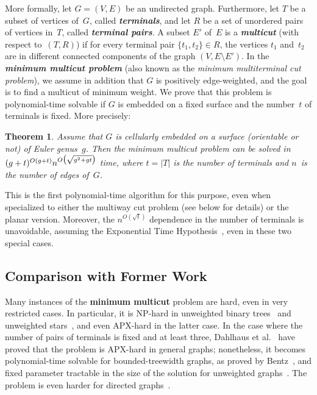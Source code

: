 \documentclass[11pt]{article}
\newcommand{\emphdef}[1]{\textcolor{blueblack}{\textbf{\emph{#1}}}}
\newcommand{\set}[1]{\ensuremath{\{#1\}}}
\theoremstyle{plain}  \newtheorem{theorem}{Theorem}[section]
\theoremstyle{definition}
\begin{document}
More formally, let $G=(V,E)$ be an undirected graph.  Furthermore, let $T$
be a subset of vertices of~$G$, called \emphdef{terminals}, and let $R$ be
a set of unordered pairs of vertices in~$T$, called \emphdef{terminal
  pairs}.  A subset $E'$ of~$E$ is a \emphdef{multicut} (with respect
to~$(T,R)$) if for every terminal pair $\set{t_1,t_2}\in R$, the vertices $t_1$
and~$t_2$ are in different connected components of the graph $(V,E\setminus
E')$.  In the \emphdef{minimum multicut problem} (also known as the
\emph{minimum multiterminal cut problem}), we assume in addition that $G$
is positively edge-weighted, and the goal is to find a multicut of minimum
weight.  We prove that this problem is polynomial-time solvable if $G$ is
embedded on a fixed surface and the number~$t$ of terminals is fixed.  More
precisely:
\begin{theorem}\label{T:main}
  Assume that $G$ is cellularly embedded on a surface (orientable or not)
  of Euler genus~$g$.  Then the minimum multicut problem can be solved in
  ${(g+t)^{O(g+t)}}\*{n^{O\big(\sqrt{g^2+gt}\big)}}$ time, where $t=|T|$ is
  the number of terminals and $n$~is the number of edges of~$G$.
\end{theorem}
This is the first polynomial-time algorithm for this purpose, even when
specialized to either the multiway cut problem (see below for details) or
the planar version.  Moreover, the $n^{O(\sqrt{t})}$ dependence in the
number of terminals is unavoidable, assuming the Exponential Time
Hypothesis~\cite{m-tlbpm-12}, even in these two special cases.

\subsection*{Comparison with Former Work}

Many instances of the \textbf{minimum multicut} problem are hard, even in
very restricted cases.  In particular, it is NP-hard in unweighted binary
trees~\cite{cfr-mugdb-03} and unweighted
stars~\cite[Theorem~3.1]{gvy-pdaai-97}, and even APX-hard in the latter
case.  In the case where the number of pairs of terminals is fixed and at
least three, Dahlhaus et al.~\cite{djpsy-cmc-94} have proved that the
problem is APX-hard in general graphs; nonetheless, it becomes
polynomial-time solvable for bounded-treewidth graphs, as proved by
Bentz~\cite[Theorem~1]{b-cmpbt-08}, and fixed parameter tractable in the
size of the solution for unweighted graphs~\cite{bdt-mf-11}.  The problem
is even harder for directed graphs~\cite{b-cmpbt-08}.
\end{document}
